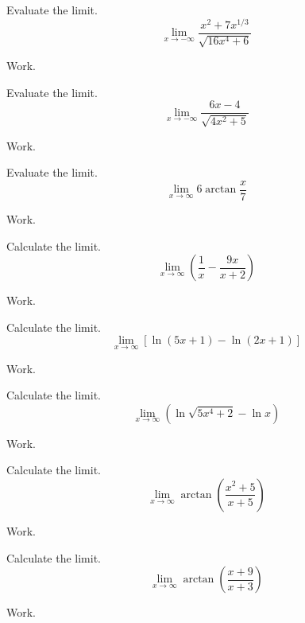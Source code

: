 \documentclass[12pt,addpoints, answers, fleqn]{exam}
\begin{document}
\begin{teacher}
\begin{questions}
\question 	%


Evaluate the limit.
\[
\lim_{x \to -\infty} \frac{x^2+7x^{1/3}}{\sqrt{16x^4+6}} 
\]
\begin{solution}
Work.
\end{solution}

\question 	%

Evaluate the limit.
\[
\lim_{x \to -\infty} \frac{6x-4}{\sqrt{4x^2+5}} 
\]
\begin{solution}
Work.
\end{solution}

\question 	%

Evaluate the limit.
\[
\lim_{x \to \infty} 6 \arctan \frac{x}{7}
\]
\begin{solution}
Work.
\end{solution}


\question 	%

Calculate the limit.
\[
\lim_{x \to \infty} \left( \frac{1}{x} - \frac{9x}{x+2} \right)
\]

\begin{solution}
Work.
\end{solution}


\question 	%

Calculate the limit.
\[
\lim_{x \to \infty} \left[ \ln \left( 5x+1\right) - \ln \left( 2x+1 \right) \right]
\]
\begin{solution}
Work.
\end{solution}




\question 	%

Calculate the limit.
\[
\lim_{x \to \infty} \left( \ln \sqrt{5x^4+2} - \ln x \right) 
\]
\begin{solution}
Work.
\end{solution}

\question 	%

Calculate the limit.
\[
\lim_{x \to \infty} \arctan \left( \frac{x^2+5}{x+5} \right)
\]
\begin{solution}
Work.
\end{solution}


\question 	%

Calculate the limit.
\[
\lim_{x \to \infty} \arctan \left( \frac{x+9}{x+3} \right)
\]
\begin{solution}
Work.
\end{solution}

\end{questions}

\end{teacher}
\vfill
\pagebreak
\end{document}

